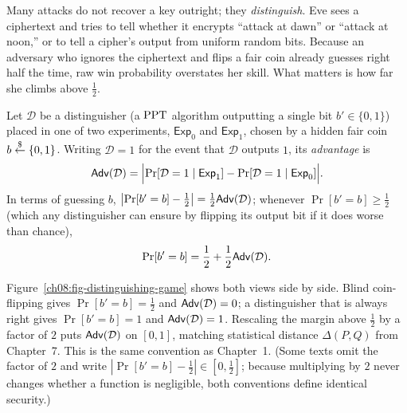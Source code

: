 Many attacks do not recover a key outright; they \emph{distinguish}. Eve sees a ciphertext and tries to tell whether it encrypts ``attack at dawn'' or ``attack at noon,'' or to tell a cipher's output from uniform random bits. Because an adversary who ignores the ciphertext and flips a fair coin already guesses right half the time, raw win probability overstates her skill. What matters is how far she climbs above $\tfrac{1}{2}$.

\begin{definition}
\label{ch08:def-adv}
Let $\mathcal D$ be a distinguisher (a $\mathrm{PPT}$ algorithm outputting a single bit $b' \in \{0,1\}$) placed in one of two experiments, $\mathsf{Exp}_0$ and $\mathsf{Exp}_1$, chosen by a hidden fair coin $b \stackrel{\$}{\gets} \{0,1\}$. Writing $\mathcal D = 1$ for the event that $\mathcal D$ outputs $1$, its \emph{advantage} is
\[
\mathsf{Adv}(\mathcal D) = \Bigl| \Pr[\mathcal D = 1 \mid \mathsf{Exp}_1] - \Pr[\mathcal D = 1 \mid \mathsf{Exp}_0] \Bigr|.
\]
In terms of guessing $b$, $\bigl|\Pr[b' = b] - \tfrac{1}{2}\bigr| = \tfrac{1}{2}\mathsf{Adv}(\mathcal D)$; whenever $\Pr[b' = b] \ge \tfrac{1}{2}$ (which any distinguisher can ensure by flipping its output bit if it does worse than chance),
\[
\Pr[b' = b] = \frac{1}{2} + \frac{1}{2}\mathsf{Adv}(\mathcal D).
\]
\end{definition}

Figure~\ref{ch08:fig-distinguishing-game} shows both views side by side. Blind coin-flipping gives $\Pr[b'=b] = \tfrac{1}{2}$ and $\mathsf{Adv}(\mathcal D) = 0$; a distinguisher that is always right gives $\Pr[b'=b] = 1$ and $\mathsf{Adv}(\mathcal D) = 1$. Rescaling the margin above $\tfrac{1}{2}$ by a factor of $2$ puts $\mathsf{Adv}(\mathcal D)$ on $[0,1]$, matching statistical distance $\Delta(P,Q)$ from Chapter~7. This is the same convention as Chapter~1. (Some texts omit the factor of $2$ and write $|\Pr[b'=b] - \tfrac{1}{2}| \in [0,\tfrac{1}{2}]$; because multiplying by $2$ never changes whether a function is negligible, both conventions define identical security.)

